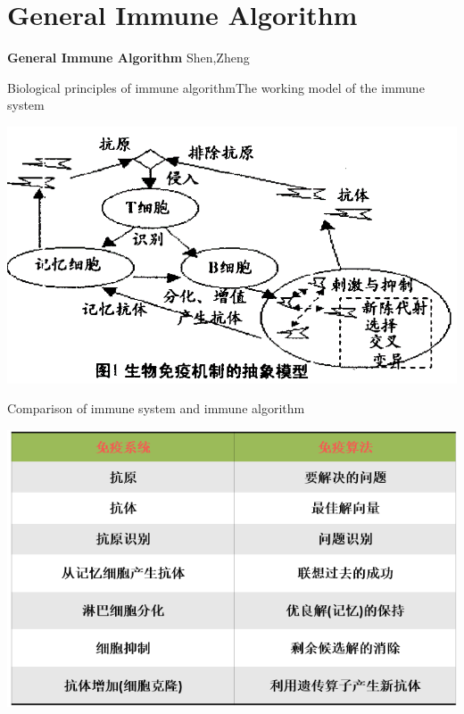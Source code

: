 \section{General Immune Algorithm}

\begin{frame}
\Huge \textbf{General Immune Algorithm}
\large {Shen,Zheng}
\end{frame}

\begin{frame}{Biological principles of immune algorithm}{The working model of the immune system}
 
  
  \par
  \centering
  \includegraphics[scale=0.5]{img/1.png}
  \par
  
\end{frame}
\begin{frame}{Comparison of immune system and immune algorithm}
 
  
  \par
  \centering
  \includegraphics[scale=0.6]{img/2.PNG}
  \par
  
\end{frame}



